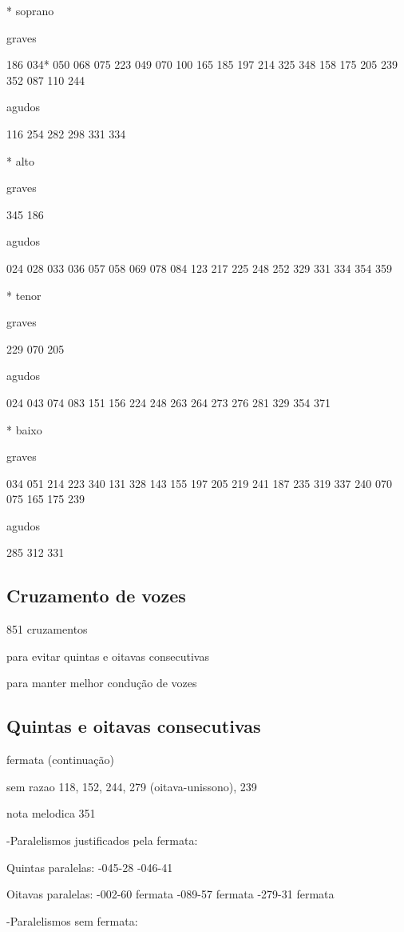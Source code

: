 \documentclass{article}
\begin{document}
* soprano

graves

186 034* 050 068 075 223 049 070 100 165 185 197 214 325 348 158 175
205 239 352 087 110 244

agudos

116 254 282 298 331 334

* alto

graves

345 186

agudos

024 028 033 036 057 058 069 078 084 123 217 225 248 252 329 331 334
354 359

* tenor

graves

229 070 205

agudos

024 043 074 083 151 156 224 248 263 264 273 276 281 329 354 371

* baixo

graves

034 051 214 223 340 131 328 143 155 197 205 219 241 187 235 319 337
240 070 075 165 175 239

agudos

285 312 331

\subsection{Cruzamento de vozes}
\label{sec:cruzamento-de-vozes}

851 cruzamentos 

para evitar quintas e oitavas consecutivas

para manter melhor condução de vozes

\subsection{Quintas e oitavas consecutivas}
\label{sec:quintas-e-oitavas}

fermata (continuação)

sem razao 118, 152, 244, 279 (oitava-unissono), 239

nota melodica 351



-Paralelismos justificados pela fermata:
 
Quintas paralelas:
-045-28 
-046-41 
 
Oitavas paralelas:
-002-60  fermata
-089-57  fermata
-279-31  fermata
 
-Paralelismos sem fermata:
 
\end{document}
